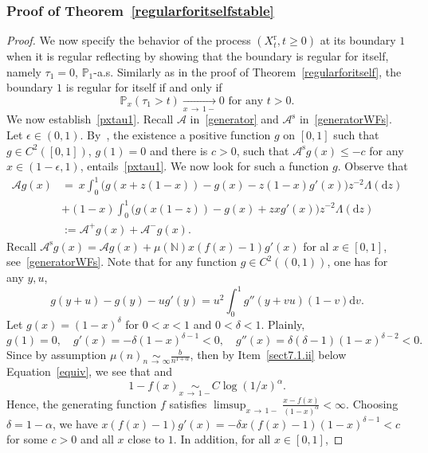 \documentclass[AHL,Unicode,longabstracts,published]{cedram}
\newcommand{\ddr}{\mathrm{d}}
\newcommand{\rmr}{\mathrm{r}}
\newcommand{\rms}{\mathrm{s}}
\newcommand{\bbN}{\mathbb{N}}
\newcommand{\bbP}{\mathbb{P}}
\newcommand{\clA}{\mathcal{A}}
\begin{document}
\subsubsection{Proof of Theorem~\ref{regularforitselfstable}}

\begin{proof}
We now specify the behavior of the process $(X_t^{\rmr},t\geq 0)$ at its boundary $1$ when it is regular reflecting by showing that the boundary is regular for itself, namely $\tau_1=0$, $\bbP_1$-a.s. Similarly as in the proof of Theorem~\ref{regularforitself}, the boundary $1$ is regular for itself if and only if
\begin{equation}\label{pxtau1}
\bbP_x(\tau_1>t)\underset{x\,\rightarrow\,1-}{\longrightarrow} 0 \text{ for any } t>0.
\end{equation}
We now establish~\eqref{pxtau1}. Recall $\clA$ in~\eqref{generator} and $\clA^{\rms}$ in~\eqref{generatorWFs}. Let $\epsilon\in (0,1)$. By~\cite[Proposition~6.3.2, p.~281]{MarkovProcessesSemigroupsandGenerators}, the existence a positive function $g$ on $[0,1]$ such that $g\in C^{2}([0,1])$, $g(1)=0$ and there is $c>0$, such that $\clA^{\rms}g(x)\leq -c$ for any $x\in (1-\epsilon,1)$, entails~\eqref{pxtau1}. We now look for such a function $g$. Observe that
\begin{align*}
\clA g(x) &=  \ x\int_{0}^{1}\big(g(x+z(1-x))-g(x)-z(1-x)g'(x)\big) z^{-2}\Lambda(\ddr z)\\
&+(1-x)\int_{0}^{1}\big(g(x(1-z))-g(x)+zxg'(x)\big) z^{-2}\Lambda(\ddr z)\\
&:=\clA^{+}g(x)+\clA^{-}g(x).
\end{align*}
Recall $\clA^{\rms}g(x)=\clA g(x)+\mu(\bbN)x(f(x)-1)g'(x)$ for al $x\in [0,1]$, see~\eqref{generatorWFs}. Note that for any function $g\in C^{2}((0,1))$, one has for any $y, u$,
\[
g(y+u)-g(y)-ug'(y)=u^2\int_0^1 g''(y+vu)(1-v)\ddr v.
\]
Let $g(x)= (1-x)^\delta$ for $0<x<1$ and $0<\delta<1$. Plainly,
\[
g(1)=0,\quad g'(x)= -\delta(1-x)^{\delta-1}<0, \quad g''(x)=\delta(\delta-1)(1-x)^{\delta-2}<0.
\]
Since by assumption $\mu(n)\underset{n\,\rightarrow \,\infty}{\sim} \frac{b}{n^{1+\alpha}}$, then by Item~\eqref{sect7.1.ii} below Equation~\eqref{equiv}, we see that and
\[
1-f(x) \underset{x\,\rightarrow\,1-}{\sim} C\log(1/x)^{\alpha}.
\]
Hence, the generating function $f$ satisfies $\limsup_{x\,\rightarrow\,1-}\frac{x-f(x)}{(1-x)^\alpha}<\infty$. Choosing $\delta=1-\alpha$, we have $x(f(x)-1)g'(x) =-\delta x(f(x)-1)(1-x)^{\delta-1}<c$ for some $c>0$ and all $x$ close to $1$. In addition, for all $x\in [0,1]$,

\end{proof}
\end{document}
